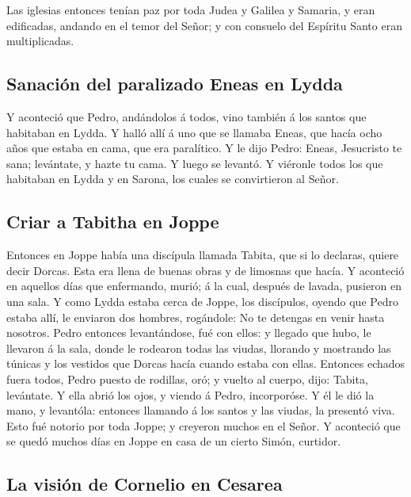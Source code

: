  Las iglesias entonces tenían paz por toda Judea y Galilea
y Samaria, y eran edificadas, andando en el temor del Señor; y con
consuelo del Espíritu Santo eran multiplicadas.

\hypertarget{sanaciuxf3n-del-paralizado-eneas-en-lydda}{%
\subsection{Sanación del paralizado Eneas en
Lydda}\label{sanaciuxf3n-del-paralizado-eneas-en-lydda}}

 Y aconteció que Pedro, andándolos á todos, vino también á
los santos que habitaban en Lydda.  Y halló allí á uno que
se llamaba Eneas, que hacía ocho años que estaba en cama, que era
paralítico.  Y le dijo Pedro: Eneas, Jesucristo te sana;
levántate, y hazte tu cama. Y luego se levantó.  Y viéronle
todos los que habitaban en Lydda y en Sarona, los cuales se convirtieron
al Señor.

\hypertarget{criar-a-tabitha-en-joppe}{%
\subsection{Criar a Tabitha en Joppe}\label{criar-a-tabitha-en-joppe}}

 Entonces en Joppe había una discípula llamada Tabita, que
si lo declaras, quiere decir Dorcas. Esta era llena de buenas obras y de
limosnas que hacía.  Y aconteció en aquellos días que
enfermando, murió; á la cual, después de lavada, pusieron en una sala.
 Y como Lydda estaba cerca de Joppe, los discípulos, oyendo
que Pedro estaba allí, le enviaron dos hombres, rogándole: No te
detengas en venir hasta nosotros.  Pedro entonces
levantándose, fué con ellos: y llegado que hubo, le llevaron á la sala,
donde le rodearon todas las viudas, llorando y mostrando las túnicas y
los vestidos que Dorcas hacía cuando estaba con ellas. 
Entonces echados fuera todos, Pedro puesto de rodillas, oró; y vuelto al
cuerpo, dijo: Tabita, levántate. Y ella abrió los ojos, y viendo á
Pedro, incorporóse.  Y él le dió la mano, y levantóla:
entonces llamando á los santos y las viudas, la presentó viva.
 Esto fué notorio por toda Joppe; y creyeron muchos en el
Señor.  Y aconteció que se quedó muchos días en Joppe en
casa de un cierto Simón, curtidor.

\hypertarget{la-visiuxf3n-de-cornelio-en-cesarea}{%
\subsection{La visión de Cornelio en
Cesarea}\label{la-visiuxf3n-de-cornelio-en-cesarea}}

